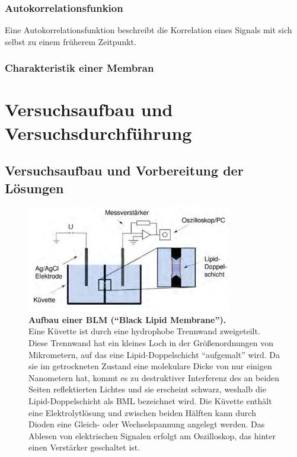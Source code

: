 \documentclass[a4paper,ngerman]{scrartcl}
\begin{document}
\subsubsection{Autokorrelationsfunkion}

Eine Autokorrelationsfunktion beschreibt die Korrelation eines Signals mit sich selbst zu einem früherem Zeitpunkt. 





\subsubsection{Charakteristik einer Membran}












\clearpage
\section{Versuchsaufbau und Versuchsdurchführung}



\subsection{Versuchsaufbau und Vorbereitung der Lösungen}
\label{sec:bilayer-vorbereitung}

\begin{figure}[tb!]
  \centering
  \includegraphics[width=0.8\textwidth]{abbildungen/blmaufbau.png}
  \caption{\textbf{Aufbau einer BLM ("`Black Lipid Membrane"').} \\Eine Küvette ist durch eine hydrophobe Trennwand zweigeteilt. Diese Trennwand hat ein kleines Loch in der Größenordnungen von Mikrometern, auf das eine Lipid-Doppelschicht "`aufgemalt"' wird. Da sie im getrockneten Zustand eine molekulare Dicke von nur einigen Nanometern hat, kommt es zu destruktiver Interferenz des an beiden Seiten reflektierten Lichtes und sie erscheint schwarz, weshalb die Lipid-Doppelschicht als BML bezeichnet wird. Die Küvette enthält eine Elektrolytlösung und zwischen beiden Hälften kann durch Dioden eine Gleich- oder Wechselspannung angelegt werden. Das Ablesen von elektrischen Signalen erfolgt am Oszilloskop, das hinter einen Verstärker geschaltet ist.}
  \label{fig:blmaufbau}
\end{figure}
\end{document}
